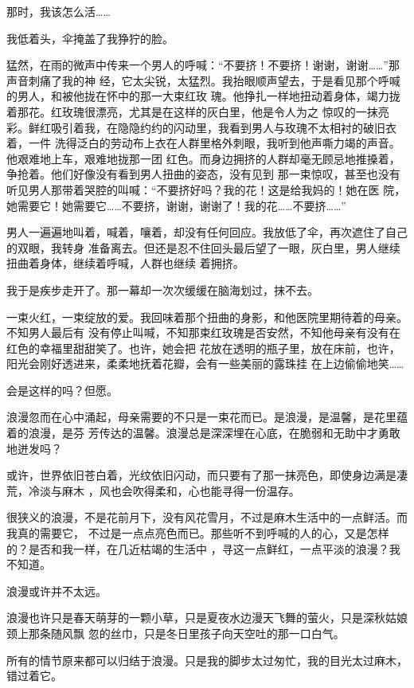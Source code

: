 \documentclass[12pt,a4paper]{article}
\begin{document}
		那时，我该怎么活……

		我低着头，伞掩盖了我狰狞的脸。

		猛然，在雨的微声中传来一个男人的呼喊：“不要挤！不要挤！谢谢，谢谢……”那声音刺痛了我的神
	经，它太尖锐，太猛烈。我抬眼顺声望去，于是看见那个呼喊的男人，和被他拢在怀中的那一大束红玫
	瑰。他挣扎一样地扭动着身体，竭力拢着那花。红玫瑰很漂亮，尤其是在这样的灰白里，他是令人为之
	惊叹的一抹亮彩。鲜红吸引着我，在隐隐约约的闪动里，我看到男人与玫瑰不太相衬的破旧衣着，一件
	洗得泛白的劳动布上衣在人群里格外刺眼，我听到他声嘶力竭的声音。他艰难地上车，艰难地拢那一团
	红色。而身边拥挤的人群却毫无顾忌地推搡着，争抢着。他们好像没有看到男人扭曲的姿态，没有见到
	那一束惊叹，甚至也没有听见男人那带着哭腔的叫喊：“不要挤好吗？我的花！这是给我妈的！她在医
	院，她需要它！她需要它……不要挤，谢谢，谢谢了！我的花……不要挤……”

		男人一遍遍地叫着，喊着，嚷着，却没有任何回应。我放低了伞，再次遮住了自己的双眼，我转身
	准备离去。但还是忍不住回头最后望了一眼，灰白里，男人继续扭曲着身体，继续着呼喊，人群也继续
	着拥挤。

		我于是疾步走开了。那一幕却一次次缓缓在脑海划过，抹不去。

		一束火红，一束绽放的爱。我回味着那个扭曲的身影，和他医院里期待着的母亲。不知男人最后有
	没有停止叫喊，不知那束红玫瑰是否安然，不知他母亲有没有在红色的幸福里甜甜笑了。也许，她会把
	花放在透明的瓶子里，放在床前，也许，阳光会刚好透进来，柔柔地抚着花瓣，会有一些美丽的露珠挂
	在上边偷偷地笑……

		会是这样的吗？但愿。

		浪漫忽而在心中涌起，母亲需要的不只是一束花而已。是浪漫，是温馨，是花里蕴着的浪漫，是芬
	芳传达的温馨。浪漫总是深深埋在心底，在脆弱和无助中才勇敢地迸发吗？

		或许，世界依旧苍白着，光纹依旧闪动，而只要有了那一抹亮色，即使身边满是凄荒，冷淡与麻木
	，风也会吹得柔和，心也能寻得一份温存。

		很狭义的浪漫，不是花前月下，没有风花雪月，不过是麻木生活中的一点鲜活。而我真的需要它，
	不过是一点点亮色而已。那些听不到呼喊的人的心，又是怎样的？是否和我一样，在几近枯竭的生活中
	，寻这一点鲜红，一点平淡的浪漫？我不知道。

		浪漫或许并不太远。

		浪漫也许只是春天萌芽的一颗小草，只是夏夜水边漫天飞舞的萤火，只是深秋姑娘颈上那条随风飘
	忽的丝巾，只是冬日里孩子向天空吐的那一口白气。

		所有的情节原来都可以归结于浪漫。只是我的脚步太过匆忙，我的目光太过麻木，错过着它。
\end{document}
